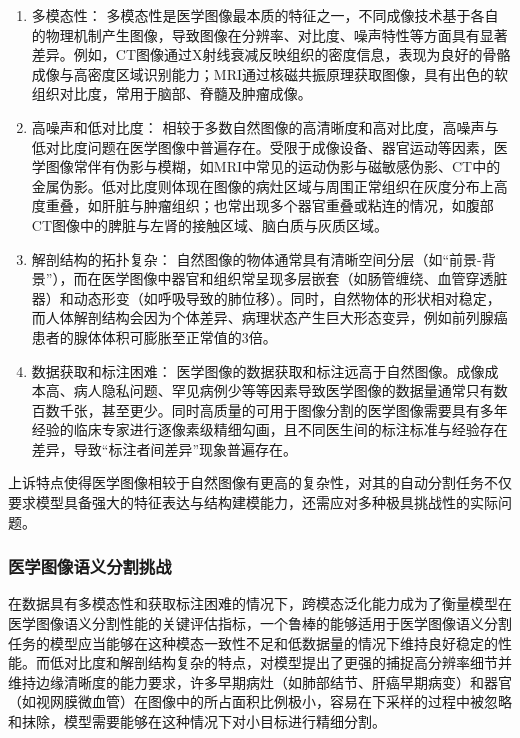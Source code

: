 \begin{enumerate}
    \item 多模态性： 
    多模态性是医学图像最本质的特征之一，不同成像技术基于各自的物理机制产生图像，导致图像在分辨率、对比度、噪声特性等方面具有显著差异。例如，CT图像通过X射线衰减反映组织的密度信息，表现为良好的骨骼成像与高密度区域识别能力；MRI通过核磁共振原理获取图像，具有出色的软组织对比度，常用于脑部、脊髓及肿瘤成像。
    
    \item 高噪声和低对比度：
    相较于多数自然图像的高清晰度和高对比度，高噪声与低对比度问题在医学图像中普遍存在。受限于成像设备、器官运动等因素，医学图像常伴有伪影与模糊，如MRI中常见的运动伪影与磁敏感伪影、CT中的金属伪影。低对比度则体现在图像的病灶区域与周围正常组织在灰度分布上高度重叠，如肝脏与肿瘤组织；也常出现多个器官重叠或粘连的情况，如腹部CT图像中的脾脏与左肾的接触区域、脑白质与灰质区域。
    
    \item 解剖结构的拓扑复杂：
    自然图像的物体通常具有清晰空间分层（如“前景-背景”），而在医学图像中器官和组织常呈现多层嵌套（如肠管缠绕、血管穿透脏器）和动态形变（如呼吸导致的肺位移）。同时，自然物体的形状相对稳定，而人体解剖结构会因为个体差异、病理状态产生巨大形态变异，例如前列腺癌患者的腺体体积可膨胀至正常值的3倍。
    
    \item 数据获取和标注困难：
    医学图像的数据获取和标注远高于自然图像。成像成本高、病人隐私问题、罕见病例少等等因素导致医学图像的数据量通常只有数百数千张，甚至更少。同时高质量的可用于图像分割的医学图像需要具有多年经验的临床专家进行逐像素级精细勾画，且不同医生间的标注标准与经验存在差异，导致“标注者间差异”现象普遍存在。
\end{enumerate}

上诉特点使得医学图像相较于自然图像有更高的复杂性，对其的自动分割任务不仅要求模型具备强大的特征表达与结构建模能力，还需应对多种极具挑战性的实际问题。

\subsubsection{医学图像语义分割挑战}

在数据具有多模态性和获取标注困难的情况下，跨模态泛化能力成为了衡量模型在医学图像语义分割性能的关键评估指标，一个鲁棒的能够适用于医学图像语义分割任务的模型应当能够在这种模态一致性不足和低数据量的情况下维持良好稳定的性能。而低对比度和解剖结构复杂的特点，对模型提出了更强的捕捉高分辨率细节并维持边缘清晰度的能力要求，许多早期病灶（如肺部结节、肝癌早期病变）和器官（如视网膜微血管）在图像中的所占面积比例极小，容易在下采样的过程中被忽略和抹除，模型需要能够在这种情况下对小目标进行精细分割。

